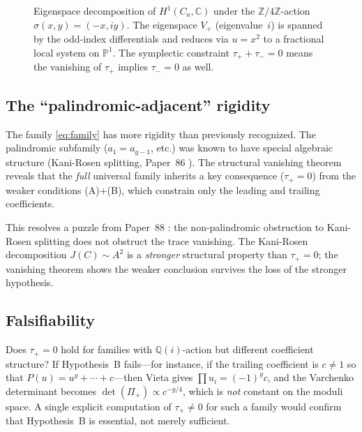 \documentclass[11pt]{article}
\theoremstyle{plain}
\theoremstyle{definition}
\theoremstyle{remark}
\newcommand{\QQ}{\mathbb{Q}}
\newcommand{\ZZ}{\mathbb{Z}}
\newcommand{\CC}{\mathbb{C}}
\newcommand{\PP}{\mathbb{P}}
\begin{document}
\begin{figure}[ht]
\caption{Eigenspace decomposition of $H^1(C_a, \CC)$ under the
  $\ZZ/4\ZZ$-action $\sigma(x,y) = (-x,iy)$.  The eigenspace $V_+$
  (eigenvalue~$i$) is spanned by the odd-index differentials and
  reduces via $u = x^2$ to a fractional local system on $\PP^1$.
  The symplectic constraint $\tau_+ + \tau_- = 0$ means the vanishing
  of $\tau_+$ implies $\tau_- = 0$ as well.}
\label{fig:eigenspace}
\end{figure}

\subsection{The ``palindromic-adjacent'' rigidity}

The family \eqref{eq:family} has more rigidity than previously recognized.
The palindromic subfamily ($a_1 = a_{g-1}$, etc.) was known to have special
algebraic structure (Kani-Rosen splitting, Paper~86 \cite{p86}).
The structural vanishing theorem reveals that the \emph{full} universal
family inherits a key consequence ($\tau_+ = 0$) from the weaker conditions
(A)+(B), which constrain only the leading and trailing coefficients.

This resolves a puzzle from Paper~88 \cite{p88}: the non-palindromic
obstruction to Kani-Rosen splitting does not obstruct the trace vanishing.
The Kani-Rosen decomposition $J(C) \sim A^2$ is a \emph{stronger} structural
property than $\tau_+ = 0$; the vanishing theorem shows the weaker conclusion
survives the loss of the stronger hypothesis.

\subsection{Falsifiability}

Does $\tau_+ = 0$ hold for families with $\QQ(i)$-action but different
coefficient structure?  If Hypothesis~B fails---for instance, if the
trailing coefficient is $c \neq 1$ so that $P(u) = u^g + \cdots + c$---then
Vieta gives $\prod u_i = (-1)^g c$, and the Varchenko determinant becomes
$\det(\Pi_+) \propto c^{-g/4}$, which is \emph{not} constant on the moduli
space.  A single explicit computation of $\tau_+ \neq 0$ for such a family
would confirm that Hypothesis~B is essential, not merely sufficient.
\end{document}

